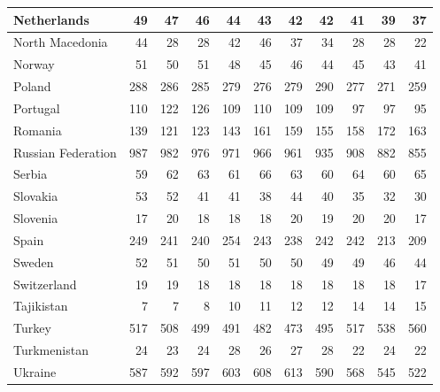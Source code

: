 \begin{table}
\begin{tabular}{|l|r|r|r|r|r|r|r|r|r|r|}
                   Netherlands&     49&     47&     46&     44&     43&     42&     42&     41&     39&     37\\\hline
               North Macedonia&     44&     28&     28&     42&     46&     37&     34&     28&     28&     22\\\hline
                        Norway&     51&     50&     51&     48&     45&     46&     44&     45&     43&     41\\\hline
                        Poland&    288&    286&    285&    279&    276&    279&    290&    277&    271&    259\\\hline
                      Portugal&    110&    122&    126&    109&    110&    109&    109&     97&     97&     95\\\hline
                       Romania&    139&    121&    123&    143&    161&    159&    155&    158&    172&    163\\\hline
            Russian Federation&    987&    982&    976&    971&    966&    961&    935&    908&    882&    855\\\hline
                        Serbia&     59&     62&     63&     61&     66&     63&     60&     64&     60&     65\\\hline
                      Slovakia&     53&     52&     41&     41&     38&     44&     40&     35&     32&     30\\\hline
                      Slovenia&     17&     20&     18&     18&     18&     20&     19&     20&     20&     17\\\hline
                         Spain&    249&    241&    240&    254&    243&    238&    242&    242&    213&    209\\\hline
                        Sweden&     52&     51&     50&     51&     50&     50&     49&     49&     46&     44\\\hline
                   Switzerland&     19&     19&     18&     18&     18&     18&     18&     18&     18&     17\\\hline
                    Tajikistan&      7&      7&      8&     10&     11&     12&     12&     14&     14&     15\\\hline
                        Turkey&    517&    508&    499&    491&    482&    473&    495&    517&    538&    560\\\hline
                  Turkmenistan&     24&     23&     24&     28&     26&     27&     28&     22&     24&     22\\\hline
                       Ukraine&    587&    592&    597&    603&    608&    613&    590&    568&    545&    522\\\hline

\end{tabular}
\end{table}
